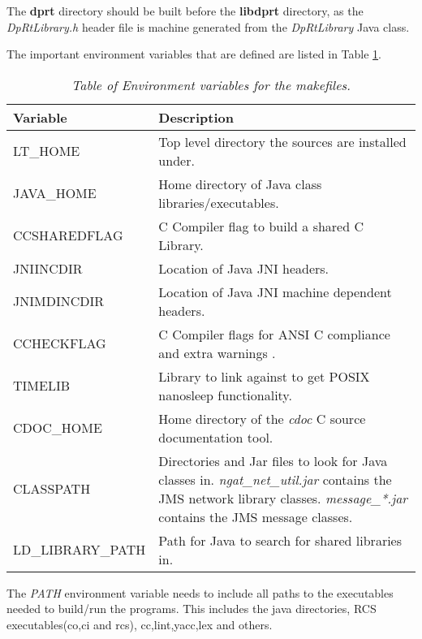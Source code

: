 \documentclass[10pt,a4paper]{article}
\begin{document}
The {\bf dprt} directory should be built before the {\bf libdprt} directory, as the {\em DpRtLibrary.h}
header file is machine generated from the {\em DpRtLibrary} Java class.

The important environment variables that are defined are listed in Table \ref{tab:makeenv}.

\begin{table}[!h]
\begin{center}
\begin{footnotesize}
\begin{tabular}{|l|p{40em}|} \hline
{\bf Variable} 	& {\bf Description} \\ \hline
LT\_HOME	& Top level directory the sources are installed under. \\ \hline
JAVA\_HOME	& Home directory of Java class libraries/executables. \\ \hline
CCSHAREDFLAG	& C Compiler flag to build a shared C Library. \\ \hline
JNIINCDIR	& Location of Java JNI headers. \\ \hline
JNIMDINCDIR	& Location of Java JNI machine dependent headers. \\ \hline
CCHECKFLAG	& C Compiler flags for ANSI C compliance and extra warnings \footnotemark. \\ \hline
TIMELIB		& Library to link against to get POSIX nanosleep functionality. \\ \hline
CDOC\_HOME	& Home directory of the {\em cdoc} C source documentation tool. \\ \hline
CLASSPATH	& Directories and Jar files to look for Java classes in. 
{\em ngat\_net\_util.jar} contains the JMS network library classes. 
{\em message\_*.jar} contains the JMS message classes.  \\ \hline
LD\_LIBRARY\_PATH & Path for Java to search for shared libraries in.  \\ \hline
\end{tabular}
\end{footnotesize}
\end{center}
\caption{\em Table of Environment variables for the makefiles.}
\label{tab:makeenv} 
\end{table}

The {\em PATH} environment variable needs to include all paths to the executables needed to build/run the 
programs. This includes the java directories, RCS executables(co,ci and rcs), cc,lint,yacc,lex and others.
\end{document}
